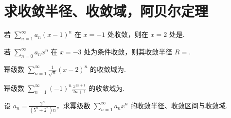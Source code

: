 \section{求收敛半径、收敛域，阿贝尔定理}

	\begin{ti}
		若 $\sum_{n=1}^{\infty} a_{n} (x - 1)^{n}$ 在 $x = -1$ 处收敛，则在 $x = 2$ 处是\kuo.

	\end{ti}

	\begin{ti}
		若 $\sum_{n=0}^{\infty} a_{n} x^{n}$ 在 $x = -3$ 处为条件收敛，则其收敛半径 $R = $\htwo.
	\end{ti}

	\begin{ti}
		幂级数 $\sum_{n=1}^{\infty} \frac{1}{\sqrt{n}} (x - 2)^{n}$ 的收敛域为\htwo.
	\end{ti}

	\begin{ti}
		幂级数 $\sum_{n=1}^{\infty} (-1)^{n} \frac{x^{2n+1}}{2n+1}$ 的收敛域为\htwo.
	\end{ti}

	\begin{ti}
		设 $a_{n} = \frac{2^{n}}{(5^{n} + 2^{n})n}$，求幂级数 $\sum_{n=1}^{\infty} a_{n} x^{n}$ 的收敛半径、收敛区间与收敛域.
	\end{ti}